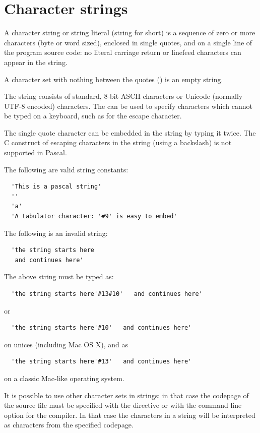 \section{Character strings}
A character string or string literal (string for short) is a sequence of zero or more
characters (byte or word sized), enclosed in single quotes, and on a single
line of the program source code: no literal carriage return or linefeed
characters can appear in the string.

A character set with nothing between the quotes () is an empty string.

The string consists of standard, 8-bit ASCII characters or Unicode (normally
UTF-8 encoded) characters. The  can be used to specify
characters which cannot be typed on a keyboard, such as  for
the escape character.

The single quote character can be embedded in the string by typing it twice.
The C construct of escaping characters in the string (using a backslash)
is not supported in Pascal.

The following are valid string constants:
\begin{verbatim}
  'This is a pascal string'
  ''
  'a'
  'A tabulator character: '#9' is easy to embed'
\end{verbatim}
The following is an invalid string:
\begin{verbatim}
  'the string starts here
   and continues here'
\end{verbatim}
The above string must be typed as:
\begin{verbatim}
  'the string starts here'#13#10'   and continues here'
\end{verbatim}
or
\begin{verbatim}
  'the string starts here'#10'   and continues here'
\end{verbatim}
on unices (including Mac OS X), and as
\begin{verbatim}
  'the string starts here'#13'   and continues here'
\end{verbatim}
on a classic Mac-like operating system.

It is possible to use other character sets in strings: in that case the
codepage of the source file must be specified with the 
directive or with the  command line option for the compiler. In that
case the characters in a string will be interpreted as characters from the
specified codepage.

